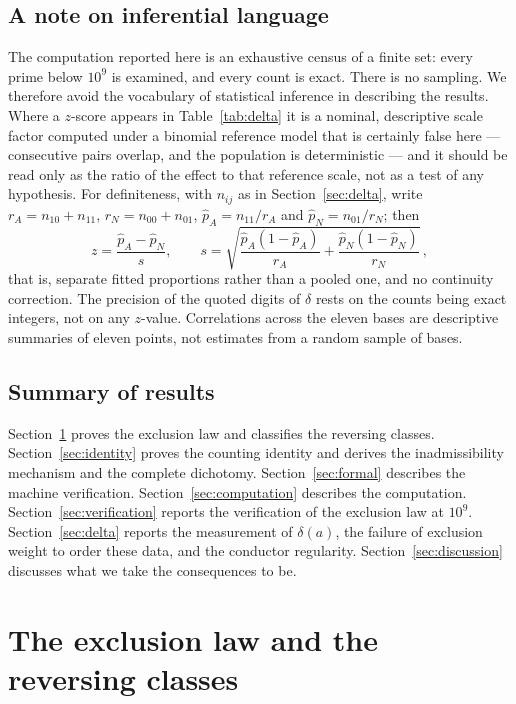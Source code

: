 \documentclass[11pt,reqno]{amsart}
\theoremstyle{plain}
\theoremstyle{definition}
\begin{document}
\subsection*{A note on inferential language}
The computation reported here is an exhaustive census of a finite set: every
prime below $10^9$ is examined, and every count is exact. There is no
sampling. We therefore avoid the vocabulary of statistical inference in
describing the results. Where a $z$-score appears in Table~\ref{tab:delta} it
is a nominal, descriptive scale factor computed under a binomial reference
model that is certainly false here --- consecutive pairs overlap, and the
population is deterministic --- and it should be read only as the ratio of the
effect to that reference scale, not as a test of any hypothesis. For
definiteness, with $n_{ij}$ as in Section~\ref{sec:delta}, write
$r_A = n_{10} + n_{11}$, $r_N = n_{00} + n_{01}$,
$\widehat{p}_{A} = n_{11}/r_A$ and $\widehat{p}_{N} = n_{01}/r_N$; then
\[
  z = \frac{\widehat{p}_A - \widehat{p}_N}{s},
  \qquad
  s = \sqrt{\frac{\widehat{p}_A(1 - \widehat{p}_A)}{r_A}
           + \frac{\widehat{p}_N(1 - \widehat{p}_N)}{r_N}}\,,
\]
that is, separate fitted proportions rather than a pooled one, and no
continuity correction. The precision
of the quoted digits of $\delta$ rests on the counts being exact integers, not
on any $z$-value. Correlations across the eleven bases are descriptive summaries of
eleven points, not estimates from a random sample of bases.

\subsection*{Summary of results}
Section~\ref{sec:exclusion} proves the exclusion law and classifies the
reversing classes. Section~\ref{sec:identity} proves the counting identity and
derives the inadmissibility mechanism and the complete dichotomy.
Section~\ref{sec:formal} describes the machine verification.
Section~\ref{sec:computation} describes the computation.
Section~\ref{sec:verification} reports the verification of the exclusion law at
$10^9$. Section~\ref{sec:delta} reports the measurement of $\delta(a)$, the
failure of exclusion weight to order these data, and the conductor
regularity. Section~\ref{sec:discussion} discusses what we take the
consequences to be.

\section{The exclusion law and the reversing classes}
\label{sec:exclusion}
\end{document}
